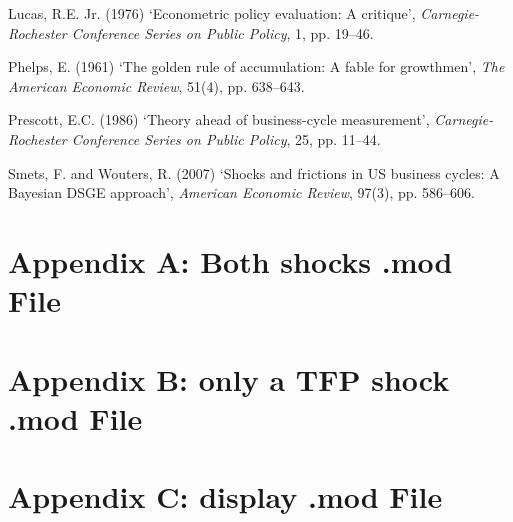 \documentclass[12pt]{article}
\begin{document}
\begin{thebibliography}{}
Lucas, R.E. Jr. (1976) ‘Econometric policy evaluation: A critique’, \textit{Carnegie-Rochester Conference Series on Public Policy}, 1, pp. 19–46.

Phelps, E. (1961) ‘The golden rule of accumulation: A fable for growthmen’, \textit{The American Economic Review}, 51(4), pp. 638–643.

Prescott, E.C. (1986) ‘Theory ahead of business-cycle measurement’, \textit{Carnegie-Rochester Conference Series on Public Policy}, 25, pp. 11–44.

Smets, F. and Wouters, R. (2007) ‘Shocks and frictions in US business cycles: A Bayesian DSGE approach’, \textit{American Economic Review}, 97(3), pp. 586–606.

\end{thebibliography}

\newpage
\appendix
\section*{Appendix A: Both shocks .mod File}



\appendix
\section*{Appendix B: only a TFP shock .mod File}



\appendix
\section*{Appendix C: display .mod File}


\end{document}
